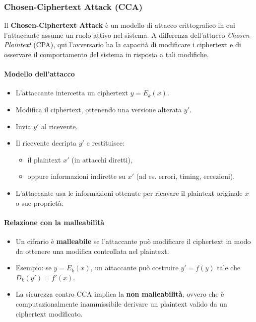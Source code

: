 \documentclass{report}
\begin{document}
\subsubsection{Chosen-Ciphertext Attack (CCA)}

Il \textbf{Chosen-Ciphertext Attack} è un modello di attacco crittografico in cui l'attaccante assume un ruolo attivo nel sistema. A differenza dell'attacco \emph{Chosen-Plaintext} (CPA), qui l'avversario ha la capacità di modificare i ciphertext e di osservare il comportamento del sistema in risposta a tali modifiche.

\paragraph{Modello dell'attacco}
\begin{itemize}
    \item L'attaccante intercetta un ciphertext $y = E_k(x)$.
    \item Modifica il ciphertext, ottenendo una versione alterata $y'$.
    \item Invia $y'$ al ricevente.
    \item Il ricevente decripta $y'$ e restituisce:
    \begin{itemize}
        \item il plaintext $x'$ (in attacchi diretti),
        \item oppure informazioni indirette su $x'$ (ad es. errori, timing, eccezioni).
    \end{itemize}
    \item L'attaccante usa le informazioni ottenute per ricavare il plaintext originale $x$ o sue proprietà.
\end{itemize}

\paragraph{Relazione con la malleabilità}
\begin{itemize}
    \item Un cifrario è \textbf{malleabile} se l'attaccante può modificare il ciphertext in modo da ottenere una modifica controllata nel plaintext.
    \item Esempio: se $y = E_k(x)$, un attaccante può costruire $y' = f(y)$ tale che $D_k(y') = f'(x)$.
    \item La sicurezza contro CCA implica la \textbf{non malleabilità}, ovvero che è computazionalmente inammissibile derivare un plaintext valido da un ciphertext modificato.
\end{itemize}
\end{document}
